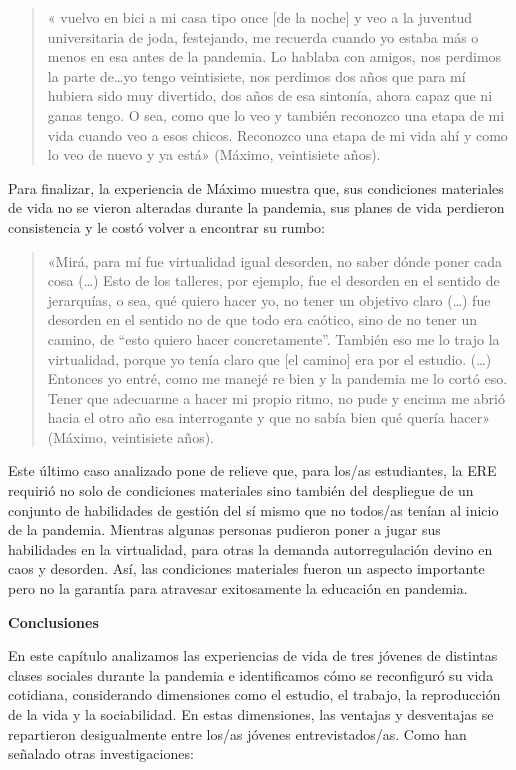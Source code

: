 \begin{quote}
« vuelvo en bici a mi casa tipo once {[}de la noche{]} y veo a la juventud universitaria de joda, festejando, me recuerda cuando yo estaba más o menos en esa antes de la pandemia. Lo hablaba con amigos, nos perdimos la parte de\ldots yo tengo veintisiete, nos perdimos dos años que para mí hubiera sido muy divertido, dos años de esa sintonía, ahora capaz que ni ganas tengo. O sea, como que lo veo y también reconozco una etapa de mi vida cuando veo a esos chicos. Reconozco una etapa de mi vida ahí y como lo veo de nuevo y ya está» (Máximo, veintisiete años).
\end{quote}

Para finalizar, la experiencia de Máximo muestra que, sus condiciones materiales de vida no se vieron alteradas durante la pandemia, sus planes de vida perdieron consistencia y le costó volver a encontrar su rumbo:

\begin{quote}
«Mirá, para mí fue virtualidad igual desorden, no saber dónde poner cada cosa (\ldots) Esto de los talleres, por ejemplo, fue el desorden en el sentido de jerarquías, o sea, qué quiero hacer yo, no tener un objetivo claro (\ldots) fue desorden en el sentido no de que todo era caótico, sino de no tener un camino, de ``esto quiero hacer concretamente''. También eso me lo trajo la virtualidad, porque yo tenía claro que {[}el camino{]} era por el estudio. (\ldots) Entonces yo entré, como me manejé re bien y la pandemia me lo cortó eso. Tener que adecuarme a hacer mi propio ritmo, no pude y encima me abrió hacia el otro año esa interrogante y que no sabía bien qué quería hacer» (Máximo, veintisiete años).
\end{quote}

Este último caso analizado pone de relieve que, para los/as estudiantes, la ERE requirió no solo de condiciones materiales sino también del despliegue de un conjunto de habilidades de gestión del sí mismo que no todos/as tenían al inicio de la pandemia. Mientras algunas personas pudieron poner a jugar sus habilidades en la virtualidad, para otras la demanda autorregulación devino en caos y desorden. Así, las condiciones materiales fueron un aspecto importante pero no la garantía para atravesar exitosamente la educación en pandemia.

\textbf{Conclusiones}

En este capítulo analizamos las experiencias de vida de tres jóvenes de distintas clases sociales durante la pandemia e identificamos cómo se reconfiguró su vida cotidiana, considerando dimensiones como el estudio, el trabajo, la reproducción de la vida y la sociabilidad. En estas dimensiones, las ventajas y desventajas se repartieron desigualmente entre los/as jóvenes entrevistados/as. Como han señalado otras investigaciones:

